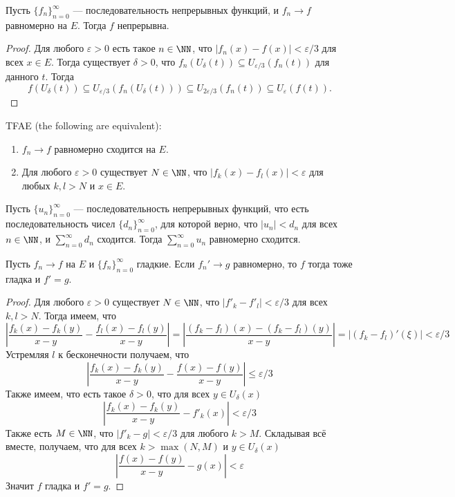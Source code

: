 \documentclass[12pt,a4paper]{article}
\begin{document}
    \begin{theorem}\label{Stokes_Zaidel_theorem}
        Пусть $\{f_n\}_{n=0}^\infty$ --- последовательность непрерывных функций, и $f_n \to f$ равномерно на $E$. Тогда $f$ непрерывна.
    \end{theorem}

    \begin{proof}
        Для любого $\varepsilon > 0$ есть такое $n \in \NN$, что $|f_n(x) - f(x)| < \varepsilon/3$ для всех $x \in E$. Тогда существует $\delta > 0$, что $f_n(U_\delta(t)) \subseteq U_{\varepsilon/3}(f_n(t))$ для данного $t$. Тогда
        \[f(U_\delta(t)) \subseteq U_{\varepsilon/3}(f_n(U_\delta(t))) \subseteq U_{2\varepsilon/3}(f_n(t)) \subseteq U_\varepsilon(f(t)).\]
    \end{proof}

    \begin{theorem}[Коши]
        TFAE (the following are equivalent):
        \begin{enumerate}
            \item $f_n \to f$ равномерно сходится на $E$.
            \item Для любого $\varepsilon > 0$ существует $N \in \NN$, что $|f_k(x) - f_l(x)| < \varepsilon$ для любых $k, l > N$ и $x \in E$.
        \end{enumerate}
    \end{theorem}

    \begin{theorem}[Вейерштрасс]\label{Weierstrass_uniform_convergence_theorem}
        Пусть $\{u_n\}_{n=0}^\infty$ --- последовательность непрерывных функций, что есть последовательность чисел $\{d_n\}_{n=0}^\infty$, для которой верно, что $|u_n| < d_n$ для всех $n \in \NN$, и $\sum_{n=0}^\infty d_n$ сходится. Тогда $\sum_{n=0}^\infty u_n$ равномерно сходится.
    \end{theorem}

    \begin{theorem}
        Пусть $f_n \to f$ на $E$ и $\{f_n\}_{n=0}^\infty$ гладкие. Если $f_n' \to g$ равномерно, то $f$ тогда тоже гладка и $f' = g$.
    \end{theorem}

    \begin{proof}
        Для любого $\varepsilon > 0$ существует $N \in \NN$, что $|f'_k - f'_l| < \varepsilon/3$ для всех $k, l > N$. Тогда имеем, что
        \[\left|\frac{f_k(x) - f_k(y)}{x - y} - \frac{f_l(x) - f_l(y)}{x - y}\right| = \left| \frac{(f_k - f_l)(x) - (f_k - f_l)(y)}{x - y} \right| = |(f_k - f_l)'(\xi)| < \varepsilon/3 \]
        Устремляя $l$ к бесконечности получаем, что
        \[\left|\frac{f_k(x) - f_k(y)}{x - y} - \frac{f(x) - f(y)}{x - y}\right| \leqslant \varepsilon/3\]
        Также имеем, что есть такое $\delta > 0$, что для всех $y \in U_\delta(x)$
        \[\left|\frac{f_k(x) - f_k(y)}{x - y} - f'_k(x)\right| < \varepsilon/3\]
        Также есть $M \in \NN$, что $|f'_k - g| < \varepsilon/3$ для любого $k > M$. Складывая всё вместе, получаем, что для всех $k > \max(N, M)$ и $y \in U_\delta(x)$
        \[\left|\frac{f(x) - f(y)}{x - y} - g(x)\right| < \varepsilon\]
        Значит $f$ гладка и $f' = g$.
    \end{proof}
\end{document}
